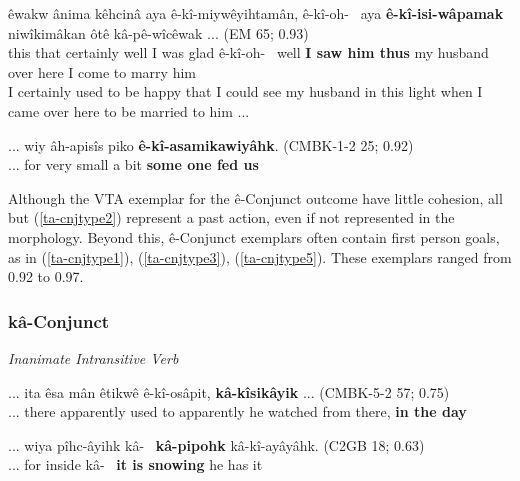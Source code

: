     \begin{exe}
    \ex
    \gll êwakw ânima kêhcinâ aya ê-kî-miywêyihtamân, ê-kî-oh-~ aya \textbf{ê-kî-isi-wâpamak} niwîkimâkan ôtê kâ-pê-wîcêwak ... \tiny{(EM 65; 0.93)} \\
    this that certainly well {I was glad} {ê-kî-oh-~} well \textbf{I saw him thus} {my husband} {over here} {I come to marry him}   \\
    \trans I certainly used to be happy that I could see my husband in this light when I came over here to be married to him ... \tiny{\citep[36-37]{Minde1997kwayask}}
    \label{ta-cnjtype4}
    \end{exe}
    
    \begin{exe}
    \ex
    \gll ... wiy âh-apisîs piko \textbf{ê-kî-asamikawiyâhk}. \tiny{(CMBK-1-2 25; 0.92)} \\
    ... for {very small} {a bit} {\textbf{some one fed us}}\\
    \trans 
    \label{ta-cnjtype5}
    \end{exe}
    
Although the VTA exemplar for the ê-Conjunct outcome have little cohesion, all but (\ref{ta-cnjtype2}) represent a past action, even if not represented in the morphology. Beyond this, ê-Conjunct exemplars often contain first person goals, as in (\ref{ta-cnjtype1}), (\ref{ta-cnjtype3}), (\ref{ta-cnjtype5}). These exemplars ranged from 0.92 to 0.97. 


\subsubsection{kâ-Conjunct}
    
\textit{Inanimate Intransitive Verb}

    \begin{exe}
    \ex
    \gll ... ita êsa mân êtikwê ê-kî-osâpit, \textbf{kâ-kîsikâyik} ... \tiny{(CMBK-5-2 57; 0.75)}  \\
    ... there apparently {used to} apparently {he watched from there}, {\textbf{in the day}}  \\
    \trans 
    \label{ii-kaacnjtype1}
    \end{exe}
    
    
    \begin{exe}
    \ex
    \gll ... wiya pîhc-âyihk kâ-~ \textbf{kâ-pipohk} kâ-kî-ayâyâhk. \tiny{(C2GB 18; 0.63)}  \\
    ... for inside kâ-~ {\textbf{it is snowing}} {he has it} \\
    \trans 
    \label{ii-kaacnjtype2}
    \end{exe}
    
